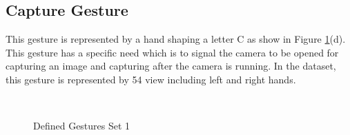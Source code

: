 \subsection{Capture Gesture}
This gesture is represented by a hand shaping a letter C as show in Figure \ref{fig:set1}(d). This gesture has a specific need which is to signal the camera to be opened for capturing an image and capturing after the camera is running. In the dataset, this gesture is represented by 54 view including left and right hands. 

\begin{figure}[h]
\begin{dBox}
\centering
  \mbox{
   }
   \caption{Defined Gestures Set 1 \label{fig:set1} }   
\end{dBox}   
\end{figure}

